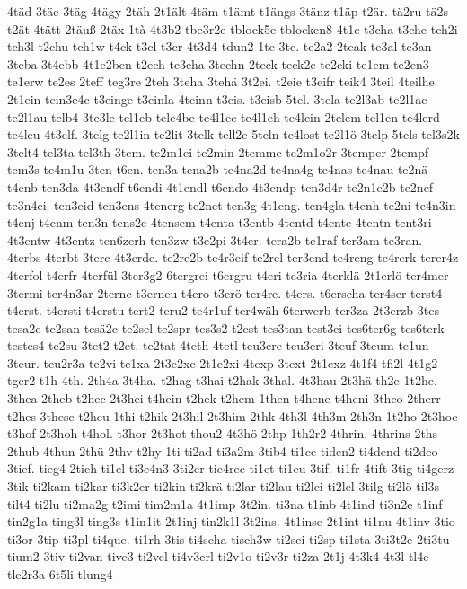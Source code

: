 {4täd
3täe
3täg
4tägy
2täh
2t1ält
4täm
t1ämt
t1ängs
3tänz
t1äp
t2är.
tä2ru
tä2s
t2ät
4tätt
2täuß
2täx
1tà
4t3b2
tbe3r2e
tblock5e
tblocken8
4t1c
t3cha
t3che
tch2i
tch3l
t2chu
tch1w
t4ck
t3cl
t3cr
4t3d4
tdun2
1te
3te.
te2a2
2teak
te3al
te3an
3teba
3t4ebb
4t1e2ben
t2ech
te3cha
3techn
2teck
teck2e
te2cki
te1em
te2en3
te1erw
te2es
2teff
teg3re
2teh
3teha
3tehä
3t2ei.
t2eie
t3eifr
teik4
3teil
4teilhe
2t1ein
tein3e4c
t3einge
t3einla
4teinn
t3eis.
t3eisb
5tel.
3tela
te2l3ab
te2l1ac
te2l1au
telb4
3te3le
tel1eb
tele4be
te4l1ec
te4l1eh
te4lein
2telem
tel1en
te4lerd
te4leu
4t3elf.
3telg
te2l1in
te2lit
3telk
tell2e
5teln
te4lost
te2l1ö
3telp
5tels
tel3s2k
3telt4
tel3ta
tel3th
3tem.
te2m1ei
te2min
2temme
te2m1o2r
3temper
2tempf
tem3s
te4m1u
3ten
t6en.
ten3a
tena2b
te4na2d
te4na4g
te4nas
te4nau
te2nä
t4enb
ten3da
4t3endf
t6endi
4t1endl
t6endo
4t3endp
ten3d4r
te2n1e2b
te2nef
te3n4ei.
ten3eid
ten3ens
4tenerg
te2net
ten3g
4t1eng.
ten4gla
t4enh
te2ni
te4n3in
t4enj
t4enm
ten3n
tens2e
4tensem
t4enta
t3entb
4tentd
t4ente
4tentn
tent3ri
4t3entw
4t3entz
ten6zerh
ten3zw
t3e2pi
3t4er.
tera2b
te1raf
ter3am
te3ran.
4terbs
4terbt
3terc
4t3erde.
te2re2b
te4r3eif
te2rel
ter3end
te4reng
te4rerk
terer4z
4terfol
t4erfr
4terfül
3ter3g2
6tergrei
t6ergru
t4eri
te3ria
4terklä
2t1erlö
ter4mer
3termi
ter4n3ar
2ternc
t3erneu
t4ero
t3erö
ter4re.
t4ers.
t6erscha
ter4ser
terst4
t4erst.
t4ersti
t4erstu
tert2
teru2
te4r1uf
ter4wäh
6terwerb
ter3za
2t3erzb
3tes
tesa2c
te2san
tesä2c
te2sel
te2spr
tes3s2
t2est
tes3tan
test3ei
tes6ter6g
tes6terk
testes4
te2su
3tet2
t2et.
te2tat
4teth
4tetl
teu3ere
teu3eri
3teuf
3teum
te1un
3teur.
teu2r3a
te2vi
te1xa
2t3e2xe
2t1e2xi
4texp
3text
2t1exz
4t1f4
tfi2l
4t1g2
tger2
t1h
4th.
2th4a
3t4ha.
t2hag
t3hai
t2hak
3thal.
4t3hau
2t3hä
th2e
1t2he.
3thea
2theb
t2hec
2t3hei
t4hein
t2hek
t2hem
1then
t4hene
t4heni
3theo
2therr
t2hes
3these
t2heu
1thi
t2hik
2t3hil
2t3him
2thk
4th3l
4th3m
2th3n
1t2ho
2t3hoc
t3hof
2t3hoh
t4hol.
t3hor
2t3hot
thou2
4t3hö
2thp
1th2r2
4thrin.
4thrins
2ths
2thub
4thun
2thü
2thv
t2hy
1ti
ti2ad
ti3a2m
3tib4
ti1ce
tiden2
ti4dend
ti2deo
3tief.
tieg4
2tieh
ti1el
ti3e4n3
3ti2er
tie4rec
ti1et
ti1eu
3tif.
ti1fr
4tift
3tig
ti4gerz
3tik
ti2kam
ti2kar
ti3k2er
ti2kin
ti2krä
ti2lar
ti2lau
ti2lei
ti2lel
3tilg
ti2lö
til3s
tilt4
ti2lu
ti2ma2g
t2imi
tim2m1a
4t1imp
3t2in.
ti3na
t1inb
4t1ind
ti3n2e
t1inf
tin2g1a
ting3l
ting3s
t1in1it
2t1inj
tin2k1l
3t2ins.
4t1inse
2t1int
ti1nu
4t1inv
3tio
ti3or
3tip
ti3pl
ti4que.
ti1rh
3tis
ti4scha
tisch3w
ti2sei
ti2sp
ti1sta
3ti3t2e
2ti3tu
tium2
3tiv
ti2van
tive3
ti2vel
ti4v3erl
ti2v1o
ti2v3r
ti2za
2t1j
4t3k4
4t3l
tl4e
tle2r3a
6t5li
tlung4
}
